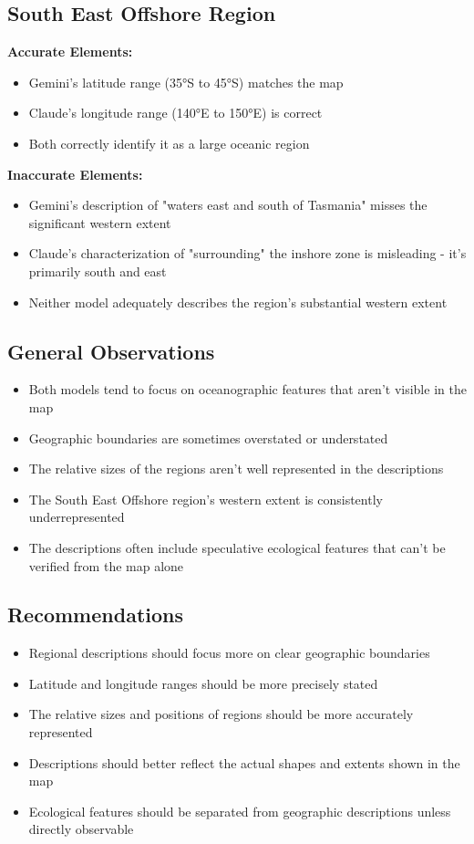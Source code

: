 \subsection{South East Offshore Region}

\textbf{Accurate Elements:}
\begin{itemize}
    \item Gemini's latitude range (35°S to 45°S) matches the map
    \item Claude's longitude range (140°E to 150°E) is correct
    \item Both correctly identify it as a large oceanic region
\end{itemize}

\textbf{Inaccurate Elements:}
\begin{itemize}
    \item Gemini's description of "waters east and south of Tasmania" misses the significant western extent
    \item Claude's characterization of "surrounding" the inshore zone is misleading - it's primarily south and east
    \item Neither model adequately describes the region's substantial western extent
\end{itemize}

\subsection{General Observations}

\begin{itemize}
    \item Both models tend to focus on oceanographic features that aren't visible in the map
    \item Geographic boundaries are sometimes overstated or understated
    \item The relative sizes of the regions aren't well represented in the descriptions
    \item The South East Offshore region's western extent is consistently underrepresented
    \item The descriptions often include speculative ecological features that can't be verified from the map alone
\end{itemize}

\subsection{Recommendations}

\begin{itemize}
    \item Regional descriptions should focus more on clear geographic boundaries
    \item Latitude and longitude ranges should be more precisely stated
    \item The relative sizes and positions of regions should be more accurately represented
    \item Descriptions should better reflect the actual shapes and extents shown in the map
    \item Ecological features should be separated from geographic descriptions unless directly observable
\end{itemize}
